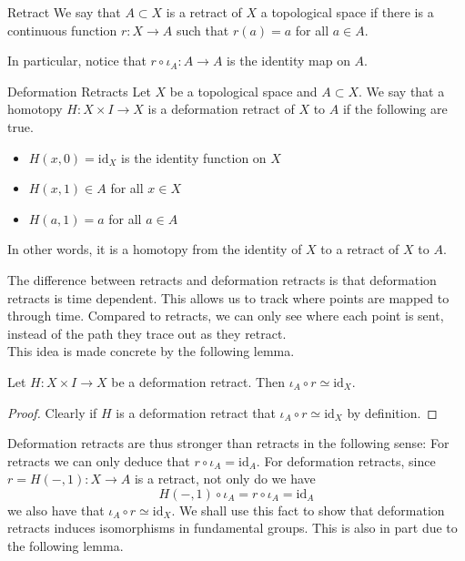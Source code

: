 \documentclass[a4paper]{article}
\begin{document}
\begin{defn}{Retract}{} We say that $A\subset X$ is a retract of $X$ a topological space if there is a continuous function $r:X\to A$ such that $r(a)=a$ for all $a\in A$. 
\end{defn}

In particular, notice that $r\circ\iota_A:A\to A$ is the identity map on $A$. 

\begin{defn}{Deformation Retracts}{} Let $X$ be a topological space and $A\subset X$. We say that a homotopy $H:X\times I\to X$ is a deformation retract of $X$ to $A$ if the following are true. 
\begin{itemize}
\item $H(x,0)=\text{id}_X$ is the identity function on $X$
\item $H(x,1)\in A$ for all $x\in X$
\item $H(a,1)=a$ for all $a\in A$
\end{itemize}
In other words, it is a homotopy from the identity of $X$ to a retract of $X$ to $A$. 
\end{defn}

The difference between retracts and deformation retracts is that deformation retracts is time dependent. This allows us to track where points are mapped to through time. Compared to retracts, we can only see where each point is sent, instead of the path they trace out as they retract. \\

This idea is made concrete by the following lemma. 

\begin{lmm}{}{} Let $H:X\times I\to X$ be a deformation retract. Then $\iota_A\circ r\simeq\text{id}_X$. 
\begin{proof}
Clearly if $H$ is a deformation retract that $\iota_A\circ r\simeq\text{id}_X$ by definition. 
\end{proof}
\end{lmm}

Deformation retracts are thus stronger than retracts in the following sense: For retracts we can only deduce that $r\circ\iota_A=\text{id}_A$. For deformation retracts, since $r=H(-,1):X\to A$ is a retract, not only do we have $$H(-,1)\circ\iota_A=r\circ\iota_A=\text{id}_A$$ we also have that $\iota_A\circ r\simeq\text{id}_X$. We shall use this fact to show that deformation retracts induces isomorphisms in fundamental groups. This is also in part due to the following lemma. 
\end{document}
